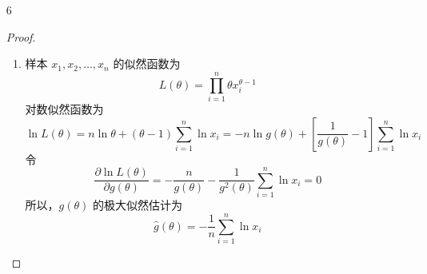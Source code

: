 \documentclass[normal,cn]{elegantnote}
\begin{document}
\begin{enumerate}
\begin{proof}
\begin{equation*}
\begin{aligned}
                    =                                                        & E\left[\frac{\partial^{2}\ln p\left(x;\theta\right)}{\partial\theta^{2}}\right]+E\left(S_{\theta}^{2}\right)                                                                                                                                                                   \\
                    =                                                        & E\left[\frac{\partial^{2}\ln p\left(x;\theta\right)}{\partial\theta^{2}}\right]+I\left(\theta\right)=0
                \end{aligned}
            \end{equation*}
            故，
            \begin{equation*}
                I\left(\theta\right)=-E\left[\frac{\partial^{2}\ln p\left(x;\theta\right)}{\partial\theta^{2}}\right]
            \end{equation*}
        \end{proof}
    \item[6]
        \begin{proof}
            \begin{enumerate}
                \item 样本 $x_{1},x_{2},\ldots,x_{n}$ 的似然函数为
                      \begin{equation*}
                          L\left(\theta\right)=\prod_{i=1}^{n}\theta x_{i}^{\theta-1}
                      \end{equation*}
                      对数似然函数为
                      \begin{equation*}
                          \ln L\left(\theta\right)=n\ln\theta+\left(\theta-1\right)\sum_{i=1}^{n}\ln x_{i}=-n\ln g\left(\theta\right)+\left[\frac{1}{g\left(\theta\right)}-1\right]\sum_{i=1}^{n}\ln x_{i}
                      \end{equation*}
                      令
                      \begin{equation*}
                          \frac{\partial\ln L\left(\theta\right)}{\partial g\left(\theta\right)}=-\frac{n}{g\left(\theta\right)}-\frac{1}{g^{2}\left(\theta\right)}\sum_{i=1}^{n}\ln x_{i}=0
                      \end{equation*}
                      所以，$g\left(\theta\right)$ 的极大似然估计为
                      \begin{equation*}
                          \hat{g}\left(\theta\right)=-\frac{1}{n}\sum_{i=1}^{n}\ln x_{i}
                      \end{equation*}

\end{enumerate}
\end{proof}
\end{enumerate}
\end{document}
